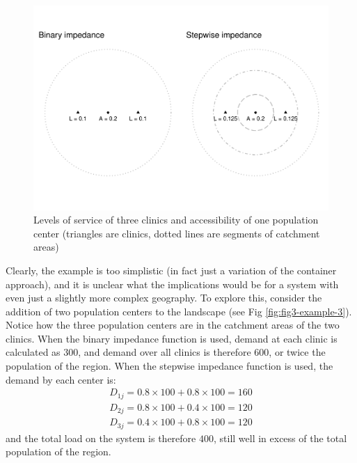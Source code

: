 \documentclass[10pt,letterpaper]{article}
\begin{document}
\begin{figure}
\includegraphics[width=0.95\linewidth]{Supply_and_Demand_Inflation_in_FCA_Methods_v2.0_files/figure-latex/fig2-example-2-1} \caption{\label{fig:fig2-example-2}Levels of service of three clinics and accessibility of one population center (triangles are clinics, dotted lines are segments of catchment areas)}\label{fig:fig2-example-2}
\end{figure}

Clearly, the example is too simplistic (in fact just a variation of the
container approach), and it is unclear what the implications would be
for a system with even just a slightly more complex geography. To
explore this, consider the addition of two population centers to the
landscape (see Fig \ref{fig:fig3-example-3}). Notice how the three
population centers are in the catchment areas of the two clinics. When
the binary impedance function is used, demand at each clinic is
calculated as \(300\), and demand over all clinics is therefore 600, or
twice the population of the region. When the stepwise impedance function
is used, the demand by each center is: \[
\begin{array}{c}
D_{1j} = 0.8\times 100 + 0.8 \times 100 = 160\\
D_{2j} = 0.8\times 100 + 0.4 \times 100 = 120\\
D_{3j} = 0.4\times 100 + 0.8 \times 100 = 120
\end{array}
\] and the total load on the system is therefore \(400\), still well in
excess of the total population of the region.
\end{document}
